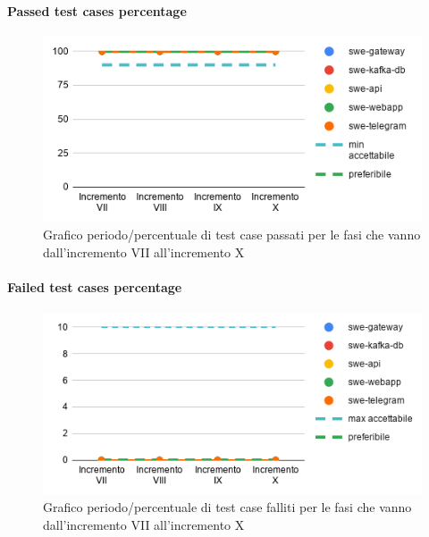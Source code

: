 \paragraph{Passed test cases percentage}
\begin{figure}[H]
			\centering
			\includegraphics[width=0.8\linewidth]{./res/images/QM-TEST-4-PTCP.png}
			\caption{Grafico periodo/percentuale di test case passati per le fasi che vanno dall'incremento VII all'incremento X}
			\label{fig:Grafico periodo/percentuale di test case passati per le fasi che vanno dall'incremento VII all'incremento X}
	\end{figure}
\paragraph{Failed test cases percentage}
\begin{figure}[H]
			\centering
			\includegraphics[width=0.8\linewidth]{./res/images/QM-TEST-5-FTCP.png}
			\caption{Grafico periodo/percentuale di test case falliti per le fasi che vanno dall'incremento VII all'incremento X}
			\label{fig:Grafico periodo/percentuale di test case falliti per le fasi che vanno dall'incremento VII all'incremento X}
	\end{figure}
